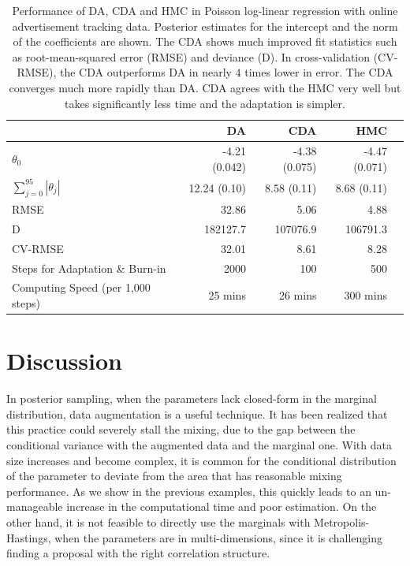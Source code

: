 \documentclass[10pt]{article}
\begin{document}
\begin{table}[H]
\centering
\begin{tabular}{|l |r |r| r| r |} 
 \hline
                          & DA & CDA & HMC\\
 [0.5ex]
 \hline
$\theta_0$                         & -4.21 (0.042)& -4.38 (0.075) & -4.47 (0.071) \\
$\sum_{j=0}^{95} |\theta_j|$         & 12.24 (0.10)&  8.58 (0.11)  & 8.68 (0.11)  \\
RMSE                              & 32.86        & 5.06          & 4.88\\
D                                 & 182127.7     & 107076.9      & 106791.3\\
CV-RMSE                           & 32.01        & 8.61          & 8.28\\
Steps for Adaptation \& Burn-in                & 2000         & 100            & 500 \\
Computing Speed (per 1,000 steps)  & 25 mins       & 26 mins        & 300 mins\\
 \hline
\end{tabular}
\caption{Performance of DA, CDA and HMC in Poisson log-linear regression with online advertisement tracking data. Posterior estimates for the intercept and the norm of the coefficients are shown. The CDA shows much improved fit statistics such as root-mean-squared error (RMSE) and deviance (D). In cross-validation (CV-RMSE), the CDA outperforms DA in nearly $4$ times lower in error. The CDA converges much more rapidly than DA. CDA agrees with the HMC very well but takes significantly less time and the adaptation is simpler.}
\label{table:Poisson}
\end{table}


\section{Discussion}

In posterior sampling, when the parameters lack closed-form in the marginal distribution, data augmentation is a useful technique. It has been realized that this practice could severely stall the mixing, due to the gap between the conditional variance with the augmented data and the marginal one. With data size increases and become complex, it is common for the conditional distribution of the parameter to deviate from the area that has reasonable mixing performance. As we show in the previous examples, this quickly leads to an un-manageable increase in the computational time and poor estimation. On the other hand, it is not feasible to directly use the marginals with Metropolis-Hastings, when the parameters are in multi-dimensions, since it is challenging  finding a proposal with the right correlation structure.
\end{document}
